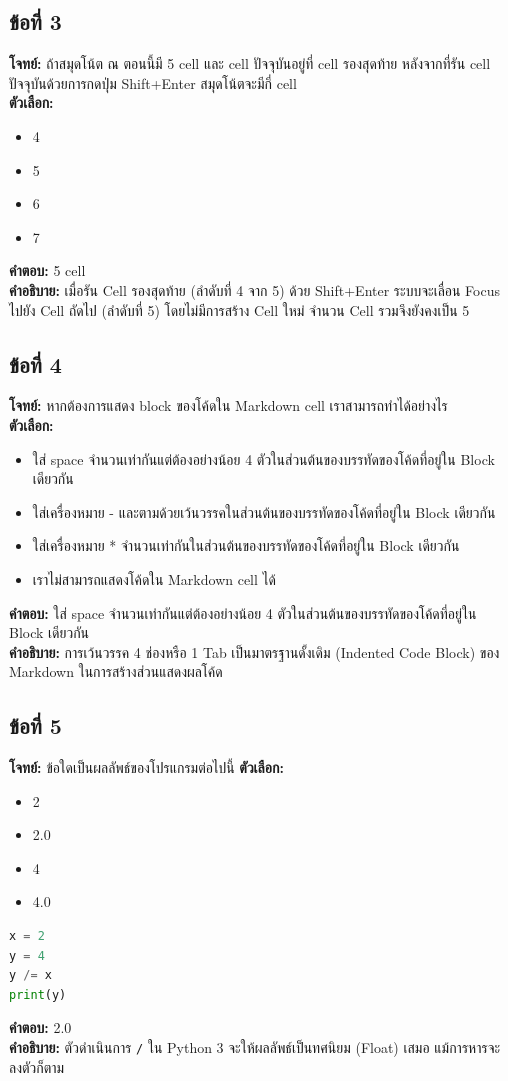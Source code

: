 \documentclass[12pt]{article}
\begin{document}
\subsection*{ข้อที่ 3}
\textbf{โจทย์:} ถ้าสมุดโน้ต ณ ตอนนี้มี 5 cell และ cell ปัจจุบันอยู่ที่ cell รองสุดท้าย หลังจากที่รัน cell ปัจจุบันด้วยการกดปุ่ม Shift+Enter สมุดโน้ตจะมีกี่ cell\\
\textbf{ตัวเลือก:}
\begin{itemize}
    \item 4
    \item 5
    \item 6
    \item 7
\end{itemize}

\textbf{คำตอบ:} 5 cell\\
\textbf{คำอธิบาย:} เมื่อรัน Cell รองสุดท้าย (ลำดับที่ 4 จาก 5) ด้วย Shift+Enter ระบบจะเลื่อน Focus ไปยัง Cell ถัดไป (ลำดับที่ 5) โดยไม่มีการสร้าง Cell ใหม่ จำนวน Cell รวมจึงยังคงเป็น 5

\subsection*{ข้อที่ 4}
\textbf{โจทย์:} หากต้องการแสดง block ของโค้ดใน Markdown cell เราสามารถทำได้อย่างไร\\
\textbf{ตัวเลือก:}
\begin{itemize}
    \item ใส่ space จำนวนเท่ากันแต่ต้องอย่างน้อย 4 ตัวในส่วนต้นของบรรทัดของโค้ดที่อยู่ใน Block เดียวกัน
    \item ใส่เครื่องหมาย - และตามด้วยเว้นวรรคในส่วนต้นของบรรทัดของโค้ดที่อยู่ใน Block เดียวกัน
    \item ใส่เครื่องหมาย * จำนวนเท่ากันในส่วนต้นของบรรทัดของโค้ดที่อยู่ใน Block เดียวกัน
    \item เราไม่สามารถแสดงโค้ดใน Markdown cell ได้
\end{itemize}

\textbf{คำตอบ:} ใส่ space จำนวนเท่ากันแต่ต้องอย่างน้อย 4 ตัวในส่วนต้นของบรรทัดของโค้ดที่อยู่ใน Block เดียวกัน\\
\textbf{คำอธิบาย:} การเว้นวรรค 4 ช่องหรือ 1 Tab เป็นมาตรฐานดั้งเดิม (Indented Code Block) ของ Markdown ในการสร้างส่วนแสดงผลโค้ด

\subsection*{ข้อที่ 5}
\textbf{โจทย์:} ข้อใดเป็นผลลัพธ์ของโปรแกรมต่อไปนี้
\textbf{ตัวเลือก:}
\begin{itemize}
    \item 2
    \item 2.0
    \item 4
    \item 4.0
\end{itemize}
\begin{lstlisting}[language=Python]
x = 2
y = 4
y /= x
print(y)
\end{lstlisting}
\textbf{คำตอบ:} 2.0\\
\textbf{คำอธิบาย:} ตัวดำเนินการ \texttt{/} ใน Python 3 จะให้ผลลัพธ์เป็นทศนิยม (Float) เสมอ แม้การหารจะลงตัวก็ตาม
\end{document}
